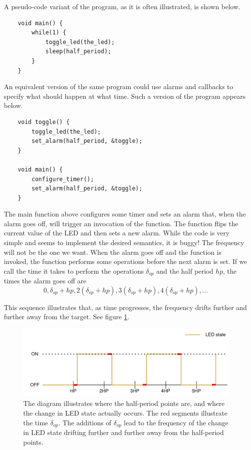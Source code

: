 A pseudo-code variant of the program, as it is often illustrated, is shown below.

\begin{verbatim}
    void main() {
        while(1) {
            toggle_led(the_led);
            sleep(half_period);
        }
    }
\end{verbatim}

An equivalent version of the same program could use alarms and callbacks to specify what should happen at what time. Such
a version of the program appears below.
\begin{verbatim}
    void toggle() {
        toggle_led(the_led);
        set_alarm(half_period, &toggle);
    }

    void main() {
        configure_timer();
        set_alarm(half_period, &toggle);
    }
\end{verbatim}

The main function above configures some timer and sets an alarm that, when the alarm goes off, will trigger an invocation of
the  function. The  function flips the current value of the LED and then sets a new alarm.
While the code is very simple and seems to implement the desired semantics, it is buggy! The frequency will not be
the one we want. When the alarm goes off and the function is invoked, the function performs some operations before the next
alarm is set. If we call the time it takes to perform the operations $\delta_{op}$ and the half period $hp$, the times the
alarm goes off are $$0, \delta_{op} + hp, 2(\delta_{op} + hp), 3(\delta_{op} + hp), 4(\delta_{op} + hp), ...$$

This sequence illustrates that, as time progresses, the frequency drifts further and further away from the target. See
figure \ref{graphics:drift}.

\begin{figure}
    \centering
    \includegraphics[scale=0.2]{graphics/drift.png}
    \caption{The diagram illustrates where the half-period points are, and where the change in LED state actually occurs.
    The red segments illustrate the time $\delta_{op}$. The additions of $\delta_{op}$ lead to the frequency of the change in
    LED state drifting further and further away from the half-period points.}
    \label{graphics:drift}
\end{figure}

